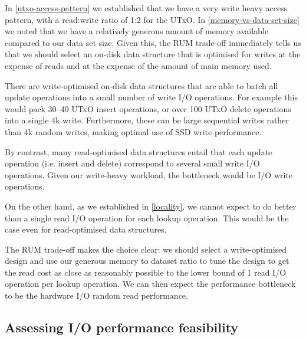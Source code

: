 \documentclass[11pt,a4paper]{article}
\begin{document}
In \cref{utxo-access-pattern} we established that we have a very write heavy
access pattern, with a read:write ratio of 1:2 for the UTxO. In
\cref{memory-vs-data-set-size} we noted that we have a relatively generous
amount of memory available compared to our data set size. Given this, the RUM
trade-off immediately tells us that we should select an on-disk data structure
that is optimised for writes at the expense of reads and at the expense of the
amount of main memory used.

There are write-optimised on-disk data structures that are able to batch all
update operations into a small number of write I/O operations. For example this
would pack 30--40 UTxO {\sc insert} operations, or over 100 UTxO {\sc delete}
operations into a single 4k write. Furthermore, these can be large sequential
writes rather than 4k random writes, making optimal use of SSD write
performance.

By contrast, many read-optimised data structures entail that each update
operation (i.e. {\sc insert} and {\sc delete}) correspond to several small
write I/O operations. Given our write-heavy workload, the bottleneck would be
I/O write operations.

On the other hand, as we established in \cref{locality}, we cannot expect to do
better than a single read I/O operation for each {\sc lookup} operation. This
would be the case even for read-optimised data structures.

The RUM trade-off makes the choice clear: we should select a write-optimised
design and use our generous memory to dataset ratio to tune the design to get
the read cost as close as reasonably possible to the lower bound of 1 read I/O
operation per {\sc lookup} operation. We can then expect the performance
bottleneck to be the hardware I/O random read performance.

\subsection{Assessing I/O performance feasibility}
\end{document}
